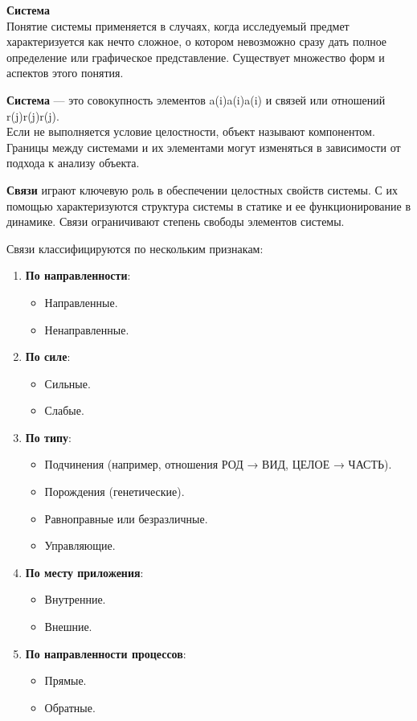 \documentclass[
]{article}
\author{}
\date{}
\providecommand{\tightlist}{%
  \setlength{\itemsep}{0pt}\setlength{\parskip}{0pt}}
\begin{document}
\textbf{Система}\\
Понятие системы применяется в случаях, когда исследуемый предмет
характеризуется как нечто сложное, о котором невозможно сразу дать
полное определение или графическое представление. Существует множество
форм и аспектов этого понятия.

\textbf{Система} --- это совокупность элементов a(i)a(i)a(i) и связей
или отношений r(j)r(j)r(j).\\
Если не выполняется условие целостности, объект называют компонентом.
Границы между системами и их элементами могут изменяться в зависимости
от подхода к анализу объекта.

\textbf{Связи} играют ключевую роль в обеспечении целостных свойств
системы. С их помощью характеризуются структура системы в статике и ее
функционирование в динамике. Связи ограничивают степень свободы
элементов системы.

Связи классифицируются по нескольким признакам:

\begin{enumerate}
\def\labelenumi{\arabic{enumi}.}
\tightlist
\item
  \textbf{По направленности}:

  \begin{itemize}
  \tightlist
  \item
    Направленные.
  \item
    Ненаправленные.
  \end{itemize}
\item
  \textbf{По силе}:

  \begin{itemize}
  \tightlist
  \item
    Сильные.
  \item
    Слабые.
  \end{itemize}
\item
  \textbf{По типу}:

  \begin{itemize}
  \tightlist
  \item
    Подчинения (например, отношения РОД → ВИД, ЦЕЛОЕ → ЧАСТЬ).
  \item
    Порождения (генетические).
  \item
    Равноправные или безразличные.
  \item
    Управляющие.
  \end{itemize}
\item
  \textbf{По месту приложения}:

  \begin{itemize}
  \tightlist
  \item
    Внутренние.
  \item
    Внешние.
  \end{itemize}
\item
  \textbf{По направленности процессов}:

  \begin{itemize}
  \tightlist
  \item
    Прямые.
  \item
    Обратные.
  \end{itemize}
\end{enumerate}
\end{document}
